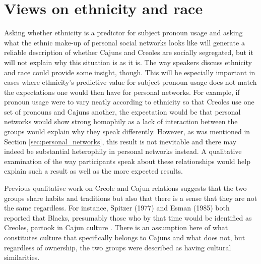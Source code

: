 \documentclass{article}\usepackage[]{graphicx}\usepackage[]{xcolor}
\begin{document}
  \section{Views on ethnicity and race}
    Asking whether ethnicity is a predictor for subject pronoun usage and asking what the ethnic make-up of personal social networks looks like will generate a reliable description of whether Cajuns and Creoles are socially segregated, but it will not explain why this situation is as it is.
    The way speakers discuss ethnicity and race could provide some insight, though.
    This will be especially important in cases where ethnicity's predictive value for subject pronoun usage does not match the expectations one would then have for personal networks.
    For example, if pronoun usage were to vary neatly according to ethnicity so that Creoles use one set of pronouns and Cajuns another, the expectation would be that personal networks would show strong homophily as a lack of interaction between the groups would explain why they speak differently.
    However, as was mentioned in Section \ref{sec:personal_networks}, this result is not inevitable and there may indeed be substantial heterophily in personal networks instead.
    A qualitative examination of the way participants speak about these relationships would help explain such a result as well as the more expected results.

    Previous qualitative work on Creole and Cajun relations suggests that the two groups share habits and traditions but also that there is a sense that they are not the same regardless.
    For instance, Spitzer (1977) and Esman (1985) both reported that Blacks, presumably those who by that time would be identified as Creoles, partook in Cajun culture \parencite[as cited in][p.~43]{brown_pronominal_1988}.
    There is an assumption here of what constitutes culture that specifically belongs to Cajuns and what does not, but regardless of ownership, the two groups were described as having cultural similarities.
\end{document}
